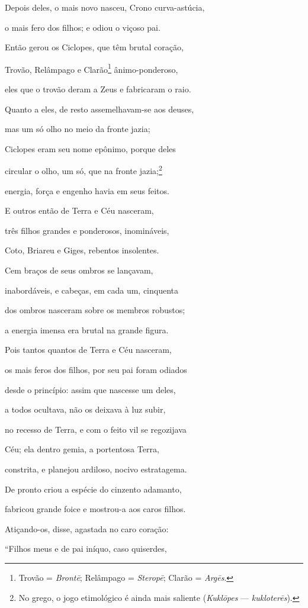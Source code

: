 \begin{pages}
\begin{Rightside}
Depois deles, o mais novo nasceu, Crono curva-astúcia,

o mais fero dos filhos; e odiou o viçoso pai.

\quad{}Então gerou os Ciclopes, que têm brutal coração,

Trovão, Relâmpago e Clarão\footnote{Trovão = \emph{Brontē}; Relâmpago = \emph{Steropē}; Clarão = \emph{Argēs}.} ânimo-ponderoso, 

eles que o trovão deram a Zeus e fabricaram o raio.

Quanto a eles, de resto assemelhavam-se aos deuses,

mas um só olho no meio da fronte jazia;

Ciclopes eram seu nome epônimo, porque deles

circular o olho, um só, que na fronte jazia;\footnote{No grego, o jogo etimológico é ainda mais saliente
(\emph{Kuklōpes} --- \emph{kukloterēs}).} 

energia, força e engenho havia em seus feitos.

\quad{}E outros então de Terra e Céu nasceram,

três filhos grandes e ponderosos, inomináveis,

Coto, Briareu e Giges, rebentos insolentes.

Cem braços de seus ombros se lançavam, 

inabordáveis, e cabeças, em cada um, cinquenta

dos ombros nasceram sobre os membros robustos;

a energia imensa era brutal na grande figura.

\quad{}Pois tantos quantos de Terra e Céu nasceram,

os mais feros dos filhos, por seu pai foram odiados 

desde o princípio: assim que nascesse um deles,

a todos ocultava, não os deixava à luz subir,

no recesso de Terra, e com o feito vil se regozijava

Céu; ela dentro gemia, a portentosa Terra,

constrita, e planejou ardiloso, nocivo estratagema. 

De pronto criou a espécie do cinzento adamanto,

fabricou grande foice e mostrou-a aos caros filhos.

\quad{}Atiçando-os, disse, agastada no caro coração:

``Filhos meus e de pai iníquo, caso quiserdes,


\end{Rightside}
\end{pages}
